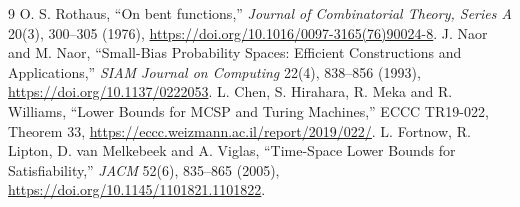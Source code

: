 \documentclass[11pt]{article}
\begin{document}
\begin{thebibliography}{9}
 O. S. Rothaus, ``On bent functions,'' \emph{Journal of
Combinatorial Theory, Series A} 20(3), 300--305 (1976),
\url{https://doi.org/10.1016/0097-3165(76)90024-8}.
 J. Naor and M. Naor, ``Small-Bias Probability Spaces:
Efficient Constructions and Applications,'' \emph{SIAM Journal on Computing}
22(4), 838--856 (1993), \url{https://doi.org/10.1137/0222053}.
 L. Chen, S. Hirahara, R. Meka and R. Williams, ``Lower Bounds for
MCSP and Turing Machines,'' ECCC TR19-022, Theorem 33,
\url{https://eccc.weizmann.ac.il/report/2019/022/}.
 L. Fortnow, R. Lipton, D. van Melkebeek and A. Viglas,
``Time-Space Lower Bounds for Satisfiability,'' \emph{JACM} 52(6), 835--865
(2005), \url{https://doi.org/10.1145/1101821.1101822}.
\end{thebibliography}
\end{document}
